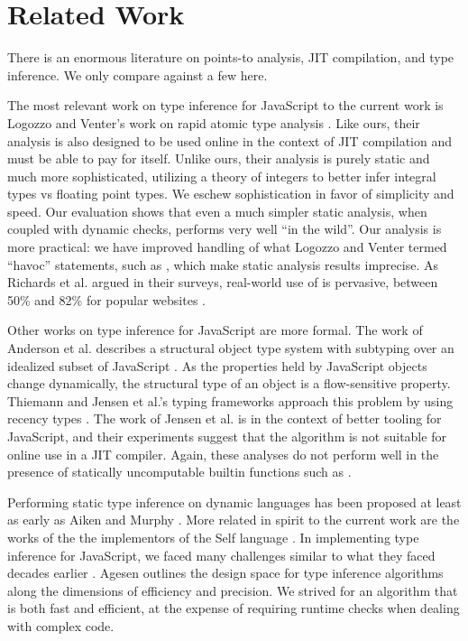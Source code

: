 \section{Related Work}
\label{sec:related-work}

There is an enormous literature on points-to analysis, JIT compilation, and
type inference. We only compare against a few here.

The most relevant work on type inference for JavaScript to the current work is
Logozzo and Venter's work on rapid atomic type analysis \cite{Logozzo10}.
Like ours, their analysis is also designed to be used online in the context of
JIT compilation and must be able to pay for itself. Unlike ours, their
analysis is purely static and much more sophisticated, utilizing a theory of
integers to better infer integral types vs floating point types. We eschew
sophistication in favor of simplicity and speed. Our evaluation shows that
even a much simpler static analysis, when coupled with dynamic checks, performs
very well ``in the wild''.
Our analysis is more
practical: we have improved handling of what Logozzo and Venter termed ``havoc''
statements, such as , which make static analysis results
imprecise. As Richards et al. argued in their surveys, real-world use of
 is pervasive, between 50\% and 82\% for popular websites
\cite{Richards11, Richards10}.

Other works on type inference for JavaScript are more formal. The work of
Anderson et al. describes a structural object type system with subtyping over
an idealized subset of JavaScript \cite{Anderson05}. As the properties held
by JavaScript objects change dynamically,
the structural type of an object is a flow-sensitive property. Thiemann
and Jensen et al.'s typing frameworks approach this problem by using recency
types \cite{Thiemann05, Jensen09}. The work of Jensen et al. is in the context
of better tooling for JavaScript, and their experiments suggest that the
algorithm is not suitable for online use in a JIT compiler. Again, these
analyses do not perform well in the presence of statically uncomputable
builtin functions such as .

Performing static type inference on dynamic languages has been proposed at
least as early as Aiken and Murphy \cite{Aiken91}. More related in spirit to
the current work are the works of the the implementors of the Self language
\cite{Ungar87}. In implementing type inference for JavaScript, we faced many
challenges similar to what they faced decades earlier \cite{Ungar92,
  Agesen94}. Agesen outlines the design space for type inference algorithms
along the dimensions of efficiency and precision. We strived for an
algorithm that is both fast and efficient, at the expense of requiring
runtime checks when dealing with complex code.

